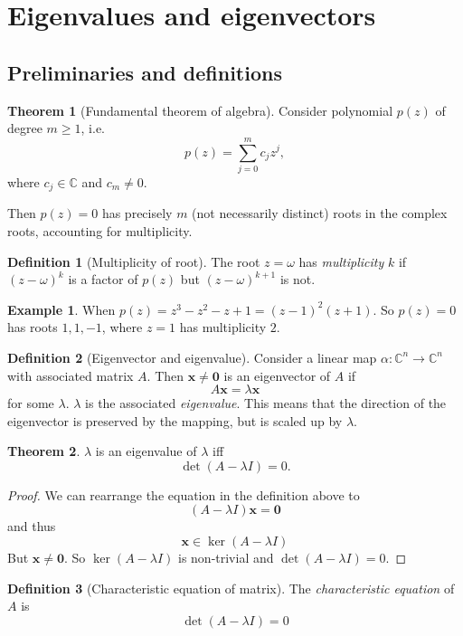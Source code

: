 \documentclass[a4paper]{article}
\theoremstyle{definition}
\newtheorem*{thm}{Theorem}
\newtheorem*{defi}{Definition}
\newtheorem*{eg}{Example}
\newcommand{\mb}[1]{\mathbf{#1}}
\newcommand{\C}{\mathbb{C}}
\let\stdsection\section
\renewcommand\section{\newpage\stdsection}
\begin{document}
\section{Eigenvalues and eigenvectors}
\subsection{Preliminaries and definitions}
\begin{thm}[Fundamental theorem of algebra]
  Consider polynomial $p(z)$ of degree $m \geq 1$, i.e.
  \[
  p(z) = \sum_{j = 0}^m c_jz^j,
  \]
  where $c_j\in \C$ and $c_m \not= 0$.

  Then $p(z) = 0$ has precisely $m$ (not necessarily distinct) roots in the complex roots, accounting for multiplicity.
\end{thm}

\begin{defi}[Multiplicity of root]
  The root $z = \omega$ has \emph{multiplicity} $k$ if $(z - \omega)^k$ is a factor of $p(z)$ but $(z - \omega)^{k + 1}$ is not.
\end{defi}

\begin{eg}
  When $p(z) = z^3 - z^2 - z + 1 = (z - 1)^2(z + 1)$. So $p(z) = 0$ has roots $1, 1, -1$, where $z = 1$ has multiplicity $2$.
\end{eg}

\begin{defi}[Eigenvector and eigenvalue]
  Consider a linear map $\alpha: \C^n\to \C^n$ with associated matrix $A$. Then $\mb{x}\not= \mb{0}$ is an eigenvector of $A$ if
  \[
  A\mb{x} = \lambda\mb{x}
  \]
  for some $\lambda$. $\lambda$ is the associated \emph{eigenvalue}. This means that the direction of the eigenvector is preserved by the mapping, but is scaled up by $\lambda$.
\end{defi}

\begin{thm}
  $\lambda$ is an eigenvalue of $\lambda$ iff
  \[
  \det(A - \lambda I) = 0.
  \]
\end{thm}

\begin{proof}
  We can rearrange the equation in the definition above to
  \[
  (A - \lambda I)\mb{x} = \mb{0}
  \]
  and thus
  \[
  \mb{x}\in \ker(A - \lambda I)
  \]
  But $\mb{x}\not= \mb{0}$. So $\ker(A - \lambda I)$ is non-trivial and $\det(A - \lambda I) = 0$.
\end{proof}

\begin{defi}[Characteristic equation of matrix]
  The \emph{characteristic equation} of $A$ is
  \[
  \det(A - \lambda I) = 0
  \]
\end{defi}
\end{document}
